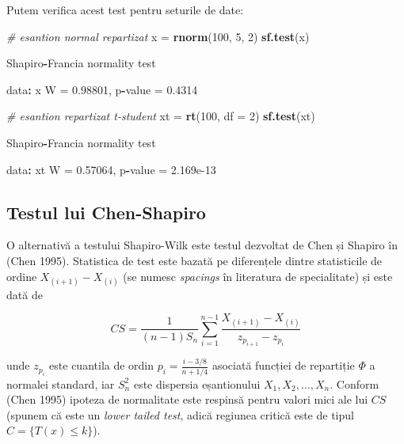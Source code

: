 \documentclass[]{article}
\newenvironment{Shaded}{\begin{snugshade}}{\end{snugshade}}
\newcommand{\KeywordTok}[1]{\textcolor[rgb]{0.13,0.29,0.53}{\textbf{#1}}}
\newcommand{\DataTypeTok}[1]{\textcolor[rgb]{0.13,0.29,0.53}{#1}}
\newcommand{\DecValTok}[1]{\textcolor[rgb]{0.00,0.00,0.81}{#1}}
\newcommand{\FloatTok}[1]{\textcolor[rgb]{0.00,0.00,0.81}{#1}}
\newcommand{\StringTok}[1]{\textcolor[rgb]{0.31,0.60,0.02}{#1}}
\newcommand{\CommentTok}[1]{\textcolor[rgb]{0.56,0.35,0.01}{\textit{#1}}}
\newcommand{\OperatorTok}[1]{\textcolor[rgb]{0.81,0.36,0.00}{\textbf{#1}}}
\newcommand{\NormalTok}[1]{#1}
\begin{document}
Putem verifica acest test pentru seturile de date:

\begin{Shaded}
\begin{Highlighting}[]
\CommentTok{# esantion normal repartizat }
\NormalTok{x =}\StringTok{ }\KeywordTok{rnorm}\NormalTok{(}\DecValTok{100}\NormalTok{, }\DecValTok{5}\NormalTok{, }\DecValTok{2}\NormalTok{)}
\KeywordTok{sf.test}\NormalTok{(x)}

\NormalTok{    Shapiro}\OperatorTok{-}\NormalTok{Francia normality test}

\NormalTok{data}\OperatorTok{:}\StringTok{  }\NormalTok{x}
\NormalTok{W =}\StringTok{ }\FloatTok{0.98801}\NormalTok{, p}\OperatorTok{-}\NormalTok{value =}\StringTok{ }\FloatTok{0.4314}

\CommentTok{# esantion repartizat t-student}
\NormalTok{xt =}\StringTok{ }\KeywordTok{rt}\NormalTok{(}\DecValTok{100}\NormalTok{, }\DataTypeTok{df =} \DecValTok{2}\NormalTok{)}
\KeywordTok{sf.test}\NormalTok{(xt)}

\NormalTok{    Shapiro}\OperatorTok{-}\NormalTok{Francia normality test}

\NormalTok{data}\OperatorTok{:}\StringTok{  }\NormalTok{xt}
\NormalTok{W =}\StringTok{ }\FloatTok{0.57064}\NormalTok{, p}\OperatorTok{-}\NormalTok{value =}\StringTok{ }\FloatTok{2.169e-13}
\end{Highlighting}
\end{Shaded}

\subsection{Testul lui Chen-Shapiro}\label{testul-lui-chen-shapiro}

O alternativă a testului Shapiro-Wilk este testul dezvoltat de Chen și
Shapiro în (Chen 1995). Statistica de test este bazată pe diferențele
dintre statisticile de ordine \(X_{(i+1)} - X_{(i)}\) (se numesc
\emph{spacings} în literatura de specialitate) și este dată de

\[
  CS = \frac{1}{(n-1)S_n}\sum_{i = 1}^{n-1}\frac{X_{(i+1)} - X_{(i)}}{z_{p_{i+1}} - z_{p_i}}
\]

unde \(z_{p_i}\) este cuantila de ordin
\(p_i = \frac{i - 3/8}{n + 1/4}\) asociată funcției de repartiție
\(\Phi\) a normalei standard, iar \(S_n^2\) este dispersia eșantionului
\(X_1, X_2, \ldots, X_n\). Conform (Chen 1995) ipoteza de normalitate
este respinsă pentru valori mici ale lui \(CS\) (spunem că este un
\emph{lower tailed test}, adică regiunea critică este de tipul
\(C = \{T(x)\leq k\}\)).
\end{document}
